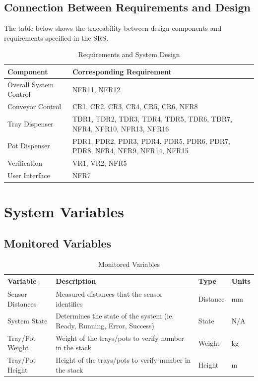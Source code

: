 \documentclass[12pt, titlepage]{article}
\begin{document}
\subsection{Connection Between Requirements and Design} \label{SecConnection}

  The table below shows the traceability between design components and requirements specified in the SRS.
  
\begin{table}[H]
\caption{Requirements and System Design}
\begin{tabularx}{\textwidth}{|l|X|}
\hline
\textbf{Component} & \textbf{Corresponding Requirement} \\ \hline
Overall System Control  & NFR11, NFR12 \\ \hline
Conveyor Control   & CR1, CR2, CR3, CR4, CR5, CR6, NFR8 \\ \hline
Tray Dispenser   & TDR1, TDR2, TDR3, TDR4, TDR5, TDR6, TDR7, NFR4, NFR10, NFR13, NFR16 \\ \hline
Pot Dispenser   &  PDR1, PDR2, PDR3, PDR4, PDR5, PDR6, PDR7, PDR8, NFR4, NFR9, NFR14, NFR15  \\ \hline
Verification   &  VR1, VR2, NFR5 \\ \hline
User Interface  &  NFR7 \\ \hline
\end{tabularx}
\end{table}

\section{System Variables}


\subsection{Monitored Variables}
\begin{table}[H]
\caption{Monitored Variables}
\begin{tabular}{ |p{3cm}|p{9cm}|p{2cm}|p{1cm}| }
  \hline
  Variable & Description & Type & Units\\
  \hline
  Sensor Distances & Measured distances that the sensor identifies
   & Distance & mm\\
  \hline
  System State & Determines the state of the system (ie. Ready, Running, Error, Success)
   & State &  N/A\\
  \hline
  Tray/Pot Weight & Weight of the trays/pots to verify number in the stack
   & Weight & kg\\
  \hline
  Tray/Pot Height & Height of the trays/pots to verify number in the stack
   & Height & m\\
  
  \hline
 \end{tabular}\\\\
 \end{table}
\end{document}
